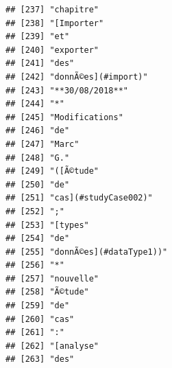 \documentclass[]{book}
\begin{document}
\begin{verbatim}
## [237] "chapitre"                                                                               
## [238] "[Importer"                                                                              
## [239] "et"                                                                                     
## [240] "exporter"                                                                               
## [241] "des"                                                                                    
## [242] "donnÃ©es](#import)"                                                                     
## [243] "**30/08/2018**"                                                                         
## [244] "*"                                                                                      
## [245] "Modifications"                                                                          
## [246] "de"                                                                                     
## [247] "Marc"                                                                                   
## [248] "G."                                                                                     
## [249] "([Ã©tude"                                                                               
## [250] "de"                                                                                     
## [251] "cas](#studyCase002)"                                                                    
## [252] ";"                                                                                      
## [253] "[types"                                                                                 
## [254] "de"                                                                                     
## [255] "donnÃ©es](#dataType1))"                                                                 
## [256] "*"                                                                                      
## [257] "nouvelle"                                                                               
## [258] "Ã©tude"                                                                                 
## [259] "de"                                                                                     
## [260] "cas"                                                                                    
## [261] ":"                                                                                      
## [262] "[analyse"                                                                               
## [263] "des"                                                                                    

\end{verbatim}
\end{document}

